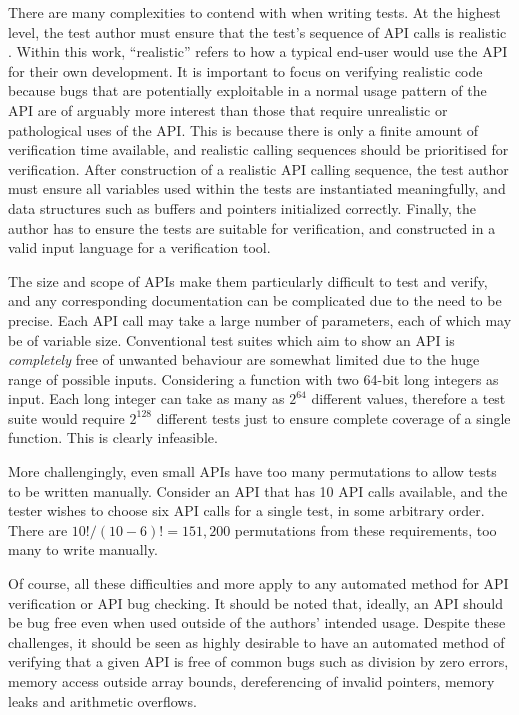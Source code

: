\documentclass[EPiCempty]{easychair}
\begin{document}
   
There are many complexities to contend with when writing tests.   At the highest level, the test author must ensure that the test's sequence of API calls is realistic \cite{ApiTestingPickingStrategy}.  Within this work, \enquote{realistic} refers to how a typical end-user would use the API for their own development.  It is important to focus on verifying realistic code because bugs that are potentially exploitable in a normal usage pattern of the API are of arguably more interest than those that require unrealistic or pathological uses of the API.  This is because there is only a finite amount of verification time available, and realistic calling sequences should be prioritised for verification.
After construction of a realistic API calling sequence, the test author must ensure all variables used within the tests are instantiated meaningfully, and data structures such as buffers and pointers initialized correctly.  
Finally, the author has to ensure the tests are suitable for verification, and constructed in a valid input language for a verification tool. 

The size and scope of APIs make them particularly difficult to test and verify, and any corresponding documentation can be complicated due to the need to be precise.  Each API call may take a large number of parameters, each of which may be of variable size.  Conventional test suites which aim to show an API is \textit{completely} free of unwanted behaviour are somewhat limited due to the huge range of possible inputs. 
Considering a function with two 64-bit long integers as input.  Each long integer can take as many as $2^{64}$ different values, therefore a test suite would require $2^{128}$ different tests just to ensure complete coverage of a single function.  This is clearly infeasible.

More challengingly, even small APIs have too many permutations to allow tests to be written manually.  Consider an API that has 10 API calls available, and the tester wishes to choose six API calls for a single test, in some arbitrary order.  There are  $10!/(10-6)!=151,200$ permutations from these requirements, too many to write manually.  


Of course, all these difficulties and more apply to any automated method for API verification or API bug checking.  It should be noted that, ideally, an API should be bug free even when used outside of the authors' intended usage.  Despite these challenges, it should be seen as highly desirable to have an automated method of verifying that a given API is free of common bugs such as division by zero errors, memory access outside array bounds, dereferencing of invalid pointers, memory leaks and arithmetic overflows.
\end{document}
